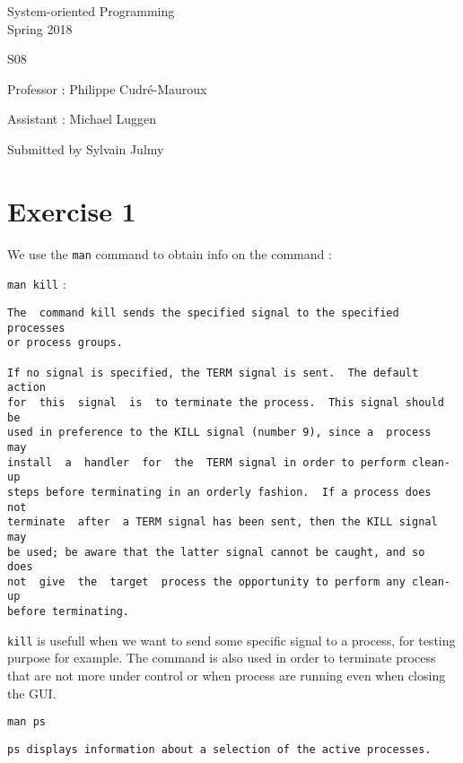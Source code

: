 \documentclass[a4paper,11pt]{report}
\author{Sylvain Julmy}
\date{\today}
\begin{document}
\begin{center}
  \Large{
    System-oriented Programming\\
    Spring 2018
  }
  
  \noindent\makebox[\linewidth]{\rule{\linewidth}{0.4pt}}
  S08
  \noindent\makebox[\linewidth]{\rule{\linewidth}{0.4pt}}

  \begin{flushleft}
    Professor : Philippe Cudré-Mauroux

    Assistant : Michael Luggen
  \end{flushleft}
  
  \noindent\makebox[\linewidth]{\rule{\linewidth}{0.4pt}}

  Submitted by Sylvain Julmy
  
  \noindent\makebox[\linewidth]{\rule{\textwidth}{1pt}}
\end{center}

\section*{Exercise 1}

We use the \verb+man+ command to obtain info on the command :

\verb+man kill+ :

\begin{verbatim}
The  command kill sends the specified signal to the specified processes
or process groups.

If no signal is specified, the TERM signal is sent.  The default action
for  this  signal  is  to terminate the process.  This signal should be
used in preference to the KILL signal (number 9), since a  process  may
install  a  handler  for  the  TERM signal in order to perform clean-up
steps before terminating in an orderly fashion.  If a process does  not
terminate  after  a TERM signal has been sent, then the KILL signal may
be used; be aware that the latter signal cannot be caught, and so  does
not  give  the  target  process the opportunity to perform any clean-up
before terminating.
\end{verbatim}

\verb+kill+ is usefull when we want to send some specific signal to a process,
for testing purpose for example. The command is also used in order to terminate
process that are not more under control or when process are running even when
closing the GUI.

\verb+man ps+

\begin{verbatim}
ps displays information about a selection of the active processes.
\end{verbatim}
\end{document}
